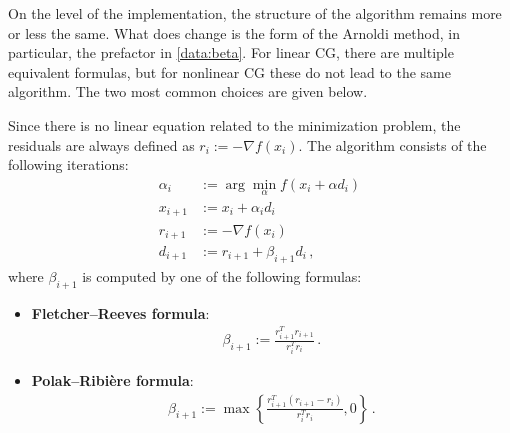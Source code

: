     On the level of the implementation, the structure of the algorithm remains more or less the same. What does change is the form of the Arnoldi method, in particular, the prefactor in \cref{data:beta}. For linear CG, there are multiple equivalent formulas, but for nonlinear CG these do not lead to the same algorithm. The two most common choices are given below.
    \begin{method}[Nonlinear CG]
        Since there is no linear equation related to the minimization problem, the residuals are always defined as $r_i:=-\nabla f(x_i)$. The algorithm consists of the following iterations:
        \begin{align}
            \alpha_i &:= \arg\min_\alpha f(x_i+\alpha d_i)\label{data:argmin}\\
            x_{i+1} &:= x_i+\alpha_id_i\\
            r_{i+1} &:= -\nabla f(x_i)\\
            d_{i+1} &:= r_{i+1}+\beta_{i+1}d_i\,,
        \end{align}
        where $\beta_{i+1}$ is computed by one of the following formulas:
        \begin{itemize}
            \item \textbf{Fletcher--Reeves formula}:
                \begin{gather}
                    \beta_{i+1} := \frac{r_{i+1}^Tr_{i+1}}{r_i^Tr_i}\,.
                \end{gather}
            \item \textbf{Polak--Ribi\`ere formula}:
                \begin{gather}
                    \label{data:polak_ribiere}
                    \beta_{i+1} := \max\left\{\frac{r_{i+1}^T(r_{i+1}-r_i)}{r_i^Tr_i}, 0\right\}\,.
                \end{gather}
        \end{itemize}
    \end{method}


